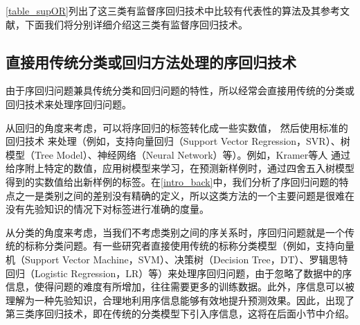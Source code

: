 \autoref{table_supOR}列出了这三类有监督序回归技术中比较有代表性的算法及其参考文献，下面我们将分别详细介绍这三类有监督序回归技术。



\subsection{直接用传统分类或回归方法处理的序回归技术}
由于序回归问题兼具传统分类和回归问题的特性，所以经常会直接用传统的分类或回归技术来处理序回归问题。

从回归的角度来考虑，可以将序回归的标签转化成一些实数值\citep{torra2006regression}，
然后使用标准的回归技术\citep{bishop2006pattern}\citep{murphy2012machine}
来处理（例如，支持向量回归（Support Vector Regression，SVR）、树模型（Tree Model）、神经网络（Neural Network）等）。例如，Kramer等人\citep{kramer2001prediction}
通过给序附上特定的数值，应用树模型来学习，在预测新样例时，通过四舍五入树模型得到的实数值给出新样例的标签。在\autoref{intro_back}中，我们分析了序回归问题的特点之一是类别之间的差别没有精确的定义，所以这类方法的一个主要问题是很难在没有先验知识的情况下对标签进行准确的度量。

从分类的角度来考虑，当我们不考虑类别之间的序关系时，序回归问题就是一个传统的标称分类问题。有一些研究者直接使用传统的标称分类模型（例如，支持向量机（Support Vector Machine，SVM\citep{cortes1995support}）、决策树（Decision Tree，DT）、罗辑思特回归（Logistic Regression，LR）等）来处理序回归问题，由于忽略了数据中的序信息，使得问题的难度有所增加，往往需要更多的训练数据。此外，序信息可以被理解为一种先验知识，合理地利用序信息能够有效地提升预测效果。因此，出现了第三类序回归技术，即在传统的分类模型下引入序信息，这将在后面小节中介绍。

